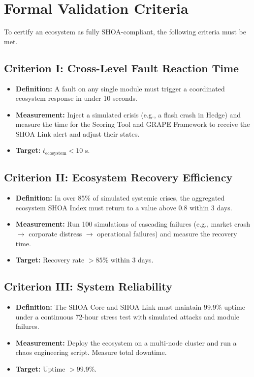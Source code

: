 \documentclass[12pt]{article}
\begin{document}
\section{Formal Validation Criteria}
To certify an ecosystem as fully SHOA-compliant, the following criteria must be met.

\subsection{Criterion I: Cross-Level Fault Reaction Time}
\begin{itemize}
    \item \textbf{Definition:} A fault on any single module must trigger a coordinated ecosystem response in under 10 seconds.
    \item \textbf{Measurement:} Inject a simulated crisis (e.g., a flash crash in Hedge) and measure the time for the Scoring Tool and GRAPE Framework to receive the SHOA Link alert and adjust their states.
    \item \textbf{Target:} $t_{\text{ecosystem}} < 10$ s.
\end{itemize}

\subsection{Criterion II: Ecosystem Recovery Efficiency}
\begin{itemize}
    \item \textbf{Definition:} In over 85\% of simulated systemic crises, the aggregated ecosystem SHOA Index must return to a value above 0.8 within 3 days.
    \item \textbf{Measurement:} Run 100 simulations of cascading failures (e.g., market crash $\to$ corporate distress $\to$ operational failures) and measure the recovery time.
    \item \textbf{Target:} Recovery rate $> 85\%$ within 3 days.
\end{itemize}

\subsection{Criterion III: System Reliability}
\begin{itemize}
    \item \textbf{Definition:} The SHOA Core and SHOA Link must maintain 99.9\% uptime under a continuous 72-hour stress test with simulated attacks and module failures.
    \item \textbf{Measurement:} Deploy the ecosystem on a multi-node cluster and run a chaos engineering script. Measure total downtime.
    \item \textbf{Target:} Uptime $> 99.9\%$.
\end{itemize}
\end{document}

